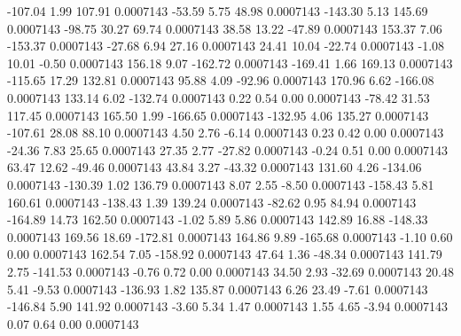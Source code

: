      -107.04        1.99      107.91     0.0007143
      -53.59        5.75       48.98     0.0007143
     -143.30        5.13      145.69     0.0007143
      -98.75       30.27       69.74     0.0007143
       38.58       13.22      -47.89     0.0007143
      153.37        7.06     -153.37     0.0007143
      -27.68        6.94       27.16     0.0007143
       24.41       10.04      -22.74     0.0007143
       -1.08       10.01       -0.50     0.0007143
      156.18        9.07     -162.72     0.0007143
     -169.41        1.66      169.13     0.0007143
     -115.65       17.29      132.81     0.0007143
       95.88        4.09      -92.96     0.0007143
      170.96        6.62     -166.08     0.0007143
      133.14        6.02     -132.74     0.0007143
        0.22        0.54        0.00     0.0007143
      -78.42       31.53      117.45     0.0007143
      165.50        1.99     -166.65     0.0007143
     -132.95        4.06      135.27     0.0007143
     -107.61       28.08       88.10     0.0007143
        4.50        2.76       -6.14     0.0007143
        0.23        0.42        0.00     0.0007143
      -24.36        7.83       25.65     0.0007143
       27.35        2.77      -27.82     0.0007143
       -0.24        0.51        0.00     0.0007143
       63.47       12.62      -49.46     0.0007143
       43.84        3.27      -43.32     0.0007143
      131.60        4.26     -134.06     0.0007143
     -130.39        1.02      136.79     0.0007143
        8.07        2.55       -8.50     0.0007143
     -158.43        5.81      160.61     0.0007143
     -138.43        1.39      139.24     0.0007143
      -82.62        0.95       84.94     0.0007143
     -164.89       14.73      162.50     0.0007143
       -1.02        5.89        5.86     0.0007143
      142.89       16.88     -148.33     0.0007143
      169.56       18.69     -172.81     0.0007143
      164.86        9.89     -165.68     0.0007143
       -1.10        0.60        0.00     0.0007143
      162.54        7.05     -158.92     0.0007143
       47.64        1.36      -48.34     0.0007143
      141.79        2.75     -141.53     0.0007143
       -0.76        0.72        0.00     0.0007143
       34.50        2.93      -32.69     0.0007143
       20.48        5.41       -9.53     0.0007143
     -136.93        1.82      135.87     0.0007143
        6.26       23.49       -7.61     0.0007143
     -146.84        5.90      141.92     0.0007143
       -3.60        5.34        1.47     0.0007143
        1.55        4.65       -3.94     0.0007143
        0.07        0.64        0.00     0.0007143
